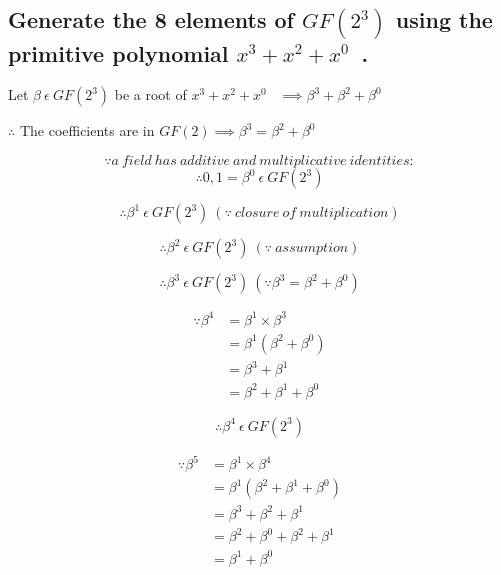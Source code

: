 \documentclass[paper=usletter, fontsize=12pt]{article}
\newcommand{\polynomial}{$x^{3}+x^{2}+x^{0}$}
\begin{document}
        \subsection{Generate the 8 elements of $GF(2^{3})$ using the primitive polynomial \polynomial~.}

            \centerline{Let $\beta \ \epsilon \ GF(2^{3})$ be a root of \polynomial~ $\implies \beta^{3}+\beta^{2}+\beta^{0}$}

            \hspace*{\fill}
            \centerline{$\therefore$ The coefficients are in $GF(2) \implies \beta^{3}=\beta^{2}+\beta^{0}$}

            \[ \because a \ field \ has \ additive \ and \ multiplicative \ identities: \]
            \[ \therefore 0, 1=\beta^{0} \ \epsilon \ GF(2^{3}) \]

            \[ \therefore \beta^{1} \ \epsilon \ GF(2^{3}) \ (\because \ closure \ of \ multiplication) \]

            \[ \therefore \beta^{2} \ \epsilon \ GF(2^{3}) \ (\because \ assumption) \]

            \[ \therefore \beta^{3} \ \epsilon \ GF(2^{3}) \ (\because \beta^{3}=\beta^{2}+\beta^{0}) \]

            \begin{equation*}
                \begin{split}
                    \because \beta^{4} & = \beta^{1} \times \beta^{3} \\
                    & = \beta^{1} (\beta^{2}+\beta^{0}) \\
                    & = \beta^{3}+\beta^{1} \\
                    & = \beta^{2}+\beta^{1}+\beta^{0}
                \end{split}
            \end{equation*}

            \[ \therefore \beta^{4} \ \epsilon \ GF(2^{3}) \]

            \begin{equation*}
                \begin{split}
                    \because \beta^{5} & = \beta^{1} \times \beta^{4} \\
                    & = \beta^{1} (\beta^{2}+\beta^{1}+\beta^{0}) \\
                    & = \beta^{3}+\beta^{2}+\beta^{1} \\
                    & = \beta^{2}+\beta^{0}+\beta^{2}+\beta^{1} \\
                    & = \beta^{1}+\beta^{0}
                \end{split}
            \end{equation*}
\end{document}

